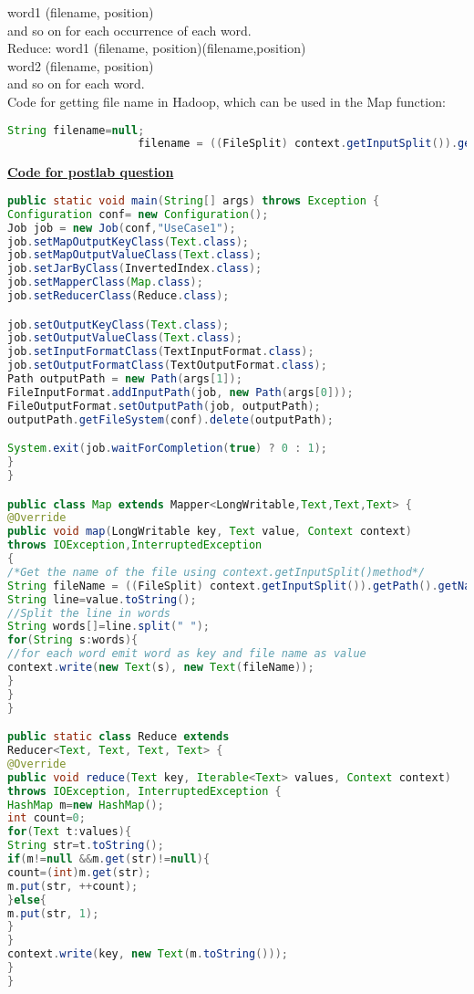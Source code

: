 \documentclass[11pt,article]{memoir}
\begin{document}
\begin{flushleft}
                    word1 (filename, position)\\
 
          and so on for each occurrence of each word. \\
          Reduce: word1 {(filename, position)(filename,position)}\\
          
                                 word2 {(filename, position)}\\
          
                   and so on for each word.\\
                   
                   Code for getting file name in Hadoop, which can be used in the Map function:
                   \begin{lstlisting}[language=java]
                    String filename=null;
                    filename = ((FileSplit) context.getInputSplit()).getPath().getName();
                   \end{lstlisting}
\textbf{\underline{Code for postlab question}}
\begin{lstlisting}[language=java]
public static void main(String[] args) throws Exception {
Configuration conf= new Configuration();
Job job = new Job(conf,"UseCase1");
job.setMapOutputKeyClass(Text.class);
job.setMapOutputValueClass(Text.class);
job.setJarByClass(InvertedIndex.class);
job.setMapperClass(Map.class);
job.setReducerClass(Reduce.class);

job.setOutputKeyClass(Text.class);
job.setOutputValueClass(Text.class);
job.setInputFormatClass(TextInputFormat.class);
job.setOutputFormatClass(TextOutputFormat.class);
Path outputPath = new Path(args[1]);
FileInputFormat.addInputPath(job, new Path(args[0]));
FileOutputFormat.setOutputPath(job, outputPath);
outputPath.getFileSystem(conf).delete(outputPath);

System.exit(job.waitForCompletion(true) ? 0 : 1);
}
}

public class Map extends Mapper<LongWritable,Text,Text,Text> {
@Override
public void map(LongWritable key, Text value, Context context)
throws IOException,InterruptedException
{
/*Get the name of the file using context.getInputSplit()method*/
String fileName = ((FileSplit) context.getInputSplit()).getPath().getName();
String line=value.toString();
//Split the line in words
String words[]=line.split(" ");
for(String s:words){
//for each word emit word as key and file name as value
context.write(new Text(s), new Text(fileName));
}
}
}

public static class Reduce extends
Reducer<Text, Text, Text, Text> {
@Override
public void reduce(Text key, Iterable<Text> values, Context context)
throws IOException, InterruptedException {
HashMap m=new HashMap();
int count=0;
for(Text t:values){
String str=t.toString();
if(m!=null &&m.get(str)!=null){
count=(int)m.get(str);
m.put(str, ++count);
}else{
m.put(str, 1);
}
}
context.write(key, new Text(m.toString()));
}
}

\end{lstlisting}                   
                          
\newpage

\end{flushleft}
\end{document}
